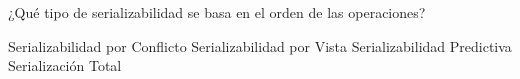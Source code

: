 \question[1] ¿Qué tipo de serializabilidad se basa en el orden de las operaciones?
\begin{choices}
\CorrectChoice Serializabilidad por Conflicto
\choice Serializabilidad por Vista
\choice Serializabilidad Predictiva
\choice Serialización Total
\end{choices}